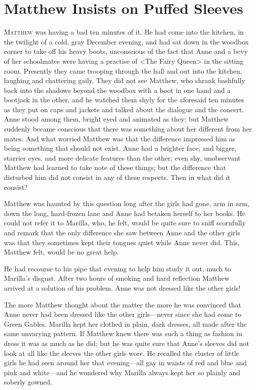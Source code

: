 \chapter{Matthew Insists on Puffed Sleeves}

\lettrine{M}{atthew} was having a bad ten minutes of it. He had come into the kitchen, in the twilight of a cold, gray December evening, and had sat down in the woodbox corner to take off his heavy boots, unconscious of the fact that Anne and a bevy of her schoolmates were having a practise of <The Fairy Queen> in the sitting room. Presently they came trooping through the hall and out into the kitchen, laughing and chattering gaily. They did not see Matthew, who shrank bashfully back into the shadows beyond the woodbox with a boot in one hand and a bootjack in the other, and he watched them shyly for the aforesaid ten minutes as they put on caps and jackets and talked about the dialogue and the concert. Anne stood among them, bright eyed and animated as they; but Matthew suddenly became conscious that there was something about her different from her mates. And what worried Matthew was that the difference impressed him as being something that should not exist. Anne had a brighter face, and bigger, starrier eyes, and more delicate features than the other; even shy, unobservant Matthew had learned to take note of these things; but the difference that disturbed him did not consist in any of these respects. Then in what did it consist?

Matthew was haunted by this question long after the girls had gone, arm in arm, down the long, hard-frozen lane and Anne had betaken herself to her books. He could not refer it to Marilla, who, he felt, would be quite sure to sniff scornfully and remark that the only difference she saw between Anne and the other girls was that they sometimes kept their tongues quiet while Anne never did. This, Matthew felt, would be no great help.

He had recourse to his pipe that evening to help him study it out, much to Marilla's disgust. After two hours of smoking and hard reflection Matthew arrived at a solution of his problem. Anne was not dressed like the other girls!

The more Matthew thought about the matter the more he was convinced that Anne never had been dressed like the other girls—never since she had come to Green Gables. Marilla kept her clothed in plain, dark dresses, all made after the same unvarying pattern. If Matthew knew there was such a thing as fashion in dress it was as much as he did; but he was quite sure that Anne's sleeves did not look at all like the sleeves the other girls wore. He recalled the cluster of little girls he had seen around her that evening—all gay in waists of red and blue and pink and white—and he wondered why Marilla always kept her so plainly and soberly gowned.

